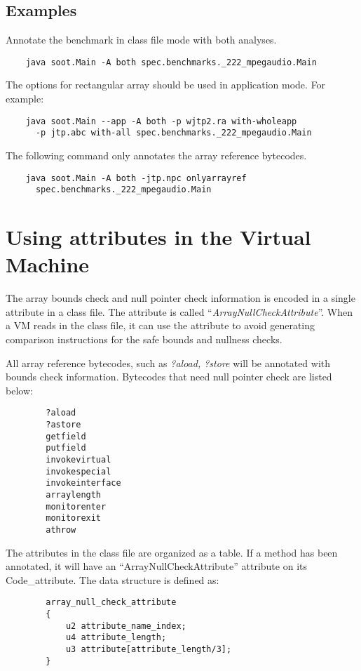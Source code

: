 \documentclass{article}
\begin{document}
\subsection{Examples}

Annotate the benchmark in class file mode with both analyses.
\begin{verbatim}
    java soot.Main -A both spec.benchmarks._222_mpegaudio.Main
\end{verbatim}

The options for rectangular array should be used in application 
mode. For example:
\begin{verbatim}
    java soot.Main --app -A both -p wjtp2.ra with-wholeapp 
      -p jtp.abc with-all spec.benchmarks._222_mpegaudio.Main
\end{verbatim}

The following command only annotates the array reference bytecodes.
\begin{verbatim}
    java soot.Main -A both -jtp.npc onlyarrayref 
      spec.benchmarks._222_mpegaudio.Main
\end{verbatim}


\section{Using attributes in the Virtual Machine}
The array bounds check and null pointer check information is encoded 
in a single attribute in a class file. The attribute is called 
``{\em ArrayNullCheckAttribute}''. When a VM reads in the class file, 
it can use the attribute to avoid generating comparison instructions for
the safe bounds and nullness checks. 

All array reference bytecodes, such as {\em ?aload, ?store} will be annotated 
with bounds check information. Bytecodes that need null pointer check 
are listed below:
\begin{verbatim}
        ?aload
        ?astore
        getfield
        putfield
        invokevirtual
        invokespecial
        invokeinterface
        arraylength
        monitorenter
        monitorexit
        athrow
\end{verbatim}

The attributes in the class file are organized as a table. If a method
has been annotated, it will have an ``ArrayNullCheckAttribute''
attribute on its Code\_attribute. The data structure is defined as:

\begin{verbatim}
        array_null_check_attribute
        {
            u2 attribute_name_index;
            u4 attribute_length;
            u3 attribute[attribute_length/3];
        }
\end{verbatim}
\end{document}
